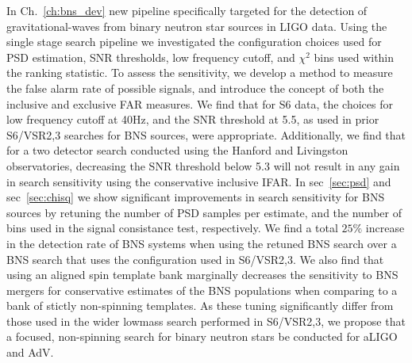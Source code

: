 
In Ch.~\ref{ch:bns_dev} new pipeline specifically targeted for the detection of gravitational-waves from binary neutron star sources in LIGO data. Using the single stage search pipeline we investigated the configuration choices used for PSD estimation, SNR thresholds, low frequency cutoff, and $\chi^2$ bins used within the ranking statistic. To assess the sensitivity, we develop a method to measure the false alarm rate of possible signals, and introduce the concept of both the inclusive and exclusive FAR measures. We find that for S6 data, the choices for low frequency cutoff at 40Hz, and the SNR threshold at 5.5, as used in prior S6/VSR2,3 searches for BNS sources, were appropriate. Additionally, we find that for a two detector search conducted using the Hanford and Livingston observatories, decreasing the SNR threshold below 5.3 will not result in any gain in search sensitivity using the conservative inclusive IFAR. In sec~\ref{sec:psd} and sec~\ref{sec:chisq} we show significant improvements in search sensitivity for BNS sources by retuning the number of PSD samples per estimate, and the number of bins used in the signal consistance test, respectively. We find a total $25\%$ increase in the detection rate of BNS systems when using the retuned BNS search over a BNS search that uses the configuration used in S6/VSR2,3. We also find that using an aligned spin template bank marginally decreases the sensitivity 
to BNS mergers for conservative estimates of the BNS populations when comparing to a bank of stictly non-spinning templates. As these tuning significantly differ from those used in the wider lowmass search performed in S6/VSR2,3, we propose that a focused, non-spinning search for binary neutron stars be conducted for aLIGO and AdV.
